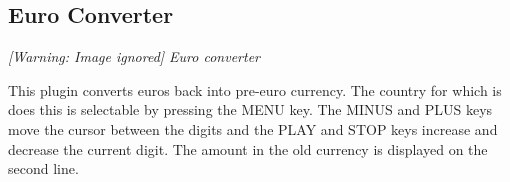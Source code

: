 \subsection{Euro Converter}
{\centering\itshape
  [Warning: Image ignored] %
 \newline
Euro converter
\par}

This plugin converts euros back into pre{}-euro currency.  The country for which is does this is selectable by pressing the MENU key.  The MINUS and
PLUS keys move the cursor between the digits and the PLAY and STOP keys
increase and decrease the current digit.  The amount in the old
currency is displayed on the second line.


